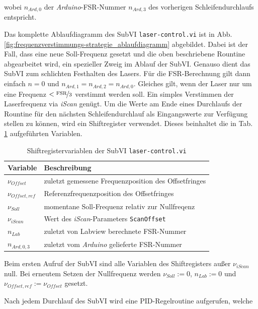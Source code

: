 wobei $n_{Ard,0}$ der \textit{Arduino}-FSR-Nummer $n_{Ard,3}$ des vorherigen
Schleifendurchlaufs entspricht.\par
Das komplette Ablaufdiagramm des SubVI \lstinline|laser-control.vi| ist in Abb.
\ref{fig:frequenzverstimmungs-strategie_ablaufdiagramm} abgebildet. Dabei ist
der Fall, dass eine neue Soll-Frequenz gesetzt und die oben beschriebene
Rountine abgearbeitet wird, ein spezieller Zweig im Ablauf der SubVI. Genauso
dient das SubVI zum schlichten Festhalten des Lasers. Für die FSR-Berechnung
gilt dann einfach $n=0$ und $n_{Ard,1}=n_{Ard,2}=n_{Ard,0}$. Gleiches gilt, wenn
der Laser nur um eine Frequenz $<\nicefrac{\text{FSR}}{3}$ verstimmt werden
soll. Ein simples Verstimmen der Laserfrequenz via \textit{iScan} genügt. Um die
Werte am Ende eines Durchlaufs der Rountine für den nächsten Schleifendurchlauf
als Eingangswerte zur Verfügung stellen zu können, wird ein Shiftregister
verwendet.
Dieses beinhaltet die in Tab.
\ref{tab:shiftregister_laserkontrolle} aufgeführten Variablen.
\begin{table}
	\begin{tabular}{p{}p{}}
		\toprule
			Variable & Beschreibung \\
		\midrule[1px]
		\hline
			$\nu_{Offset}$ & zuletzt gemessene Frequenzposition des Offsetfringes\\
			$\nu_{Offset,ref}$ & Referenzfrequenzposition des Offsetfringes\\
			$\nu_{Soll}$ & momentane Soll-Frequenz relativ zur Nullfreqenz\\
			$\nu_{iScan}$ & Wert des \textit{iScan}-Parameters \lstinline|ScanOffset|\\
			$n_{Lab}$ & zuletzt von Labview berechnete FSR-Nummer\\
			$n_{Ard,0,3}$ & zuletzt vom \textit{Arduino} gelieferte FSR-Nummer\\
		\bottomrule[1px]
	\end{tabular}
	\caption[Shiftregister - \lstinline|laser-control.vi|]{Shiftregistervariablen
	der SubVI \lstinline|laser-control.vi|}
	\label{tab:shiftregister_laserkontrolle}
\end{table}
Beim ersten Aufruf der SubVI sind alle Variablen des Shiftregisters außer
$\nu_{iScan}$ null. Bei erneutem Setzen der Nullfrequenz werden $\nu_{Soll}:=0$,
$n_{Lab}:=0$ und $\nu_{Offset,ref}:=\nu_{Offset}$ gesetzt.\par
Nach jedem Durchlauf des SubVI wird eine PID-Regelroutine aufgerufen, welche
